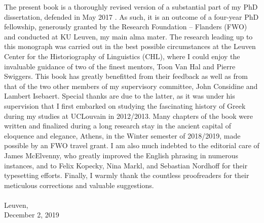 \addchap{\lsAcknowledgementTitle} 
 
The present book is a thoroughly revised version of a substantial part of my PhD dissertation, defended in May 2017 \parencite{VanRooy2017}. As such, it is an outcome of a four-year PhD fellowship, generously granted by the Research Foundation – Flanders (FWO) and conducted at KU Leuven, my main alma mater. The research leading up to this monograph was carried out in the best possible circumstances at the Leuven Center for the Historiography of Linguistics (CHL), where I could enjoy the invaluable guidance of two of the finest mentors, Toon Van Hal and Pierre Swiggers. This book has greatly benefitted from their feedback as well as from that of the two other members of my supervisory committee, John Considine and Lambert Isebaert. Special thanks are due to the latter, as it was under his supervision that I first embarked on studying the fascinating history of Greek  during my studies at UCLouvain in 2012/2013. Many chapters of the book were written and finalized during a long research stay in the ancient capital of eloquence and elegance, Athens, in the Winter semester of 2018/2019, made possible by an FWO travel grant. I am also much indebted to the editorial care of James McElvenny, who greatly improved the English phrasing in numerous instances, and to Felix Kopecky, Nina Markl, and Sebastian Nordhoff for their typesetting efforts. Finally, I warmly thank the countless proofreaders for their meticulous corrections and valuable suggestions.\\\\
Leuven,\\December 2, 2019
